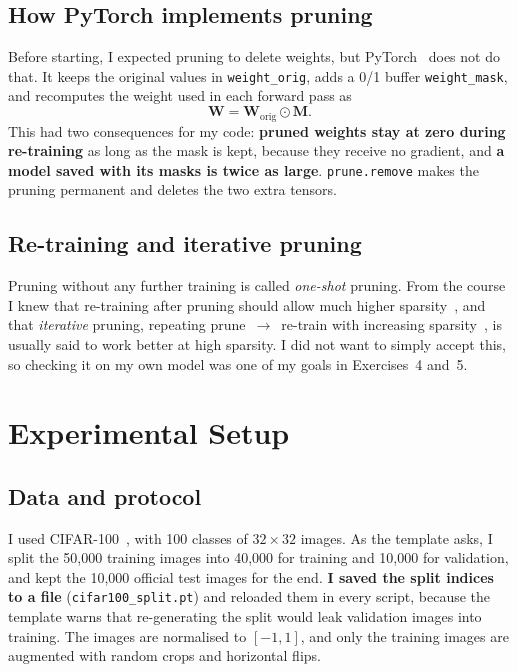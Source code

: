 \documentclass[11pt,a4paper]{article}
\newcommand{\code}[1]{\texttt{#1}}
\begin{document}
\subsection{How PyTorch implements pruning}
Before starting, I expected pruning to delete weights, but PyTorch~\cite{paszke2019pytorch,paganini2019pruning} does not do that. It keeps the original values in \code{weight\_orig}, adds a 0/1 buffer \code{weight\_mask}, and recomputes the weight used in each forward pass as
\begin{equation}
  \mathbf{W} = \mathbf{W}_{\text{orig}} \odot \mathbf{M}.
\end{equation}
This had two consequences for my code: \textbf{pruned weights stay at zero during re-training} as long as the mask is kept, because they receive no gradient, and \textbf{a model saved with its masks is twice as large}. \code{prune.remove} makes the pruning permanent and deletes the two extra tensors.

\subsection{Re-training and iterative pruning}
Pruning without any further training is called \emph{one-shot} pruning. From the course I knew that re-training after pruning should allow much higher sparsity~\cite{han2015learning}, and that \emph{iterative} pruning, repeating prune~$\rightarrow$~re-train with increasing sparsity~\cite{zhu2017prune}, is usually said to work better at high sparsity. I did not want to simply accept this, so checking it on my own model was one of my goals in Exercises~4 and~5.

\section{Experimental Setup}

\subsection{Data and protocol}
I used CIFAR-100~\cite{krizhevsky2009learning}, with 100 classes of $32\times32$ images. As the template asks, I split the 50{,}000 training images into 40{,}000 for training and 10{,}000 for validation, and kept the 10{,}000 official test images for the end. \textbf{I saved the split indices to a file} (\code{cifar100\_split.pt}) and reloaded them in every script, because the template warns that re-generating the split would leak validation images into training. The images are normalised to $[-1,1]$, and only the training images are augmented with random crops and horizontal flips.
\end{document}
